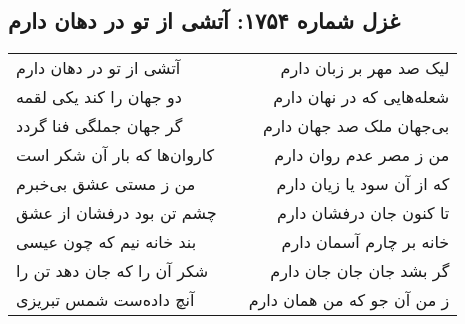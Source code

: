 \begin{center}
\section*{غزل شماره ۱۷۵۴: آتشی از تو در دهان دارم}
\label{sec:1754}
\begin{longtable}{l p{0.5cm} r}
آتشی از تو در دهان دارم
&&
لیک صد مهر بر زبان دارم
\\
دو جهان را کند یکی لقمه
&&
شعله‌هایی که در نهان دارم
\\
گر جهان جملگی فنا گردد
&&
بی‌جهان ملک صد جهان دارم
\\
کاروان‌ها که بار آن شکر است
&&
من ز مصر عدم روان دارم
\\
من ز مستی عشق بی‌خبرم
&&
که از آن سود یا زیان دارم
\\
چشم تن بود درفشان از عشق
&&
تا کنون جان درفشان دارم
\\
بند خانه نیم که چون عیسی
&&
خانه بر چارم آسمان دارم
\\
شکر آن را که جان دهد تن را
&&
گر بشد جان جان جان دارم
\\
آنچ داده‌ست شمس تبریزی
&&
ز من آن جو که من همان دارم
\\
\end{longtable}
\end{center}
